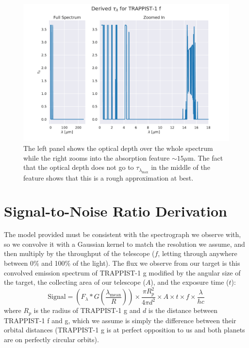 \documentclass{knac}
\begin{document}
\begin{figure}[bht]
\centering
\includegraphics[angle=0,scale=0.4]{tau_lambda.pdf}
\caption{The left panel shows the optical depth over the whole spectrum while the right zooms into the absorption feature $\sim 15 \mu$m. The fact that the optical depth does not go to $\tau_{\lambda_{\mathrm{max}}}$ in the middle of the feature shows that this is a rough approximation at best.}
\label{figure:tau}
\end{figure}

\section{Signal-to-Noise Ratio Derivation}
The model provided must be consistent with the spectrograph we observe with, so we convolve it with a Gaussian kernel to match the resolution we assume, and then multiply by the throughput of the telescope ($f$, letting through anywhere between 0\% and 100\% of the light). The flux we observe from our target is this convolved emission spectrum of TRAPPIST-1 g modified by the angular size of the target, the collecting area of our telescope ($A$), and the exposure time ($t$):
\begin{equation}
\mathrm{Signal} = \left(F_\lambda * G(\frac{\lambda_\mathrm{mean}}{R})\right) \times \frac{\pi R_p^2}{4\pi d^2} \times A \times t \times f \times\frac{\lambda}{hc}
\end{equation} where $R_p$ is the radius of TRAPPIST-1 g and $d$ is the distance between TRAPPIST-1 f and g, which we assume is simply the difference between their orbital distances (TRAPPIST-1 g is at perfect opposition to us and both planets are on perfectly circular orbits).
\end{document}
